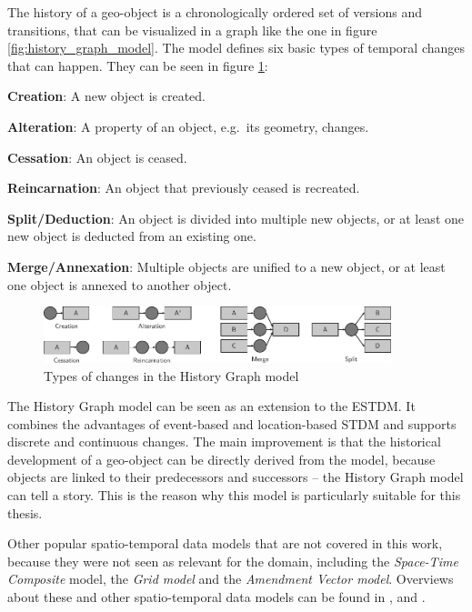 The history of a geo-object is a chronologically ordered set of versions and transitions, that can be visualized in a graph like the one in figure \ref{fig:history_graph_model}.
The model defines six basic types of temporal changes that can happen. They can be seen in figure \ref{fig:history_graph_changes}:

\begin{compactitem}
  \item \textbf{Creation}:           A new object is created.
  \item \textbf{Alteration}:         A property of an object, e.g.\ its geometry, changes.
  \item \textbf{Cessation}:          An object is ceased.
  \item \textbf{Reincarnation}:      An object that previously ceased is recreated.
  \item \textbf{Split/Deduction}:    An object is divided into multiple new objects, or at least one new object is deducted from an existing one.
  \item \textbf{Merge/Annexation}:   Multiple objects are unified to a new object, or at least one object is annexed to another object.
\end{compactitem}

\begin{figure}[ht]
  \vspace{1em}
  \centering
  \includegraphics[width=0.9\textwidth]{graphics/basics/stdm/history_graph_changes}
  \caption{Types of changes in the History Graph model}
  \label{fig:history_graph_changes}
\end{figure}

The History Graph model can be seen as an extension to the ESTDM. It combines the advantages of event-based and location-based STDM and supports discrete and continuous changes. The main improvement is that the historical development of a geo-object can be directly derived from the model, because objects are linked to their predecessors and successors -- the History Graph model can tell a story. This is the reason why this model is particularly suitable for this thesis.


\vspace{1em}
Other popular spatio-temporal data models that are not covered in this work, because they were not seen as relevant for the domain, including the \emph{Space-Time Composite} model, the \emph{Grid model} and the \emph{Amendment Vector model}. Overviews about these and other spatio-temporal data models can be found in \cite{zhao11}, \cite{pelekis04stdms} and \cite{peuquet99}.

